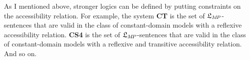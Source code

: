 
%


As I mentioned above, stronger logics can be defined by putting constraints on
the accessibility relation. For example, the system \textbf{CT} is the set of
$\mathfrak{L}_{M\!P}$-sentences that are valid in the class of constant-domain 
models with a reflexive accessibility relation. \textbf{CS4} is the set of
$\mathfrak{L}_{M\!P}$-sentences that are valid in the class of constant-domain 
models with a reflexive and transitive accessibility relation. And so on.

